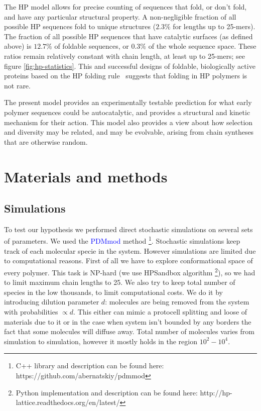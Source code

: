 \documentclass[journal=jacsat,manuscript=article,layout=twocolumn]{achemso}
\newcommand*{\blue}[1]{\textcolor{blue}{#1}}
\begin{document}
 The HP model allows for precise counting of sequences that fold, or don't fold, 
 and have any particular structural property.  A non-negligible fraction of all possible HP 
sequences fold to unique structures ($2.3\% $ for lengths up to 25-mers).  The fraction of all 
possible HP sequences that have catalytic surfaces (as defined above) is $12.7\%$ of foldable 
sequences, or $0.3\%$ of the whole sequence space.  These ratios remain relatively constant with 
chain length, at least up to 25-mers; see figure \ref{fig:hp-statistics}.  This and successful 
designs of foldable, biologically active proteins based on the HP folding rule~\cite{Murphy2015} 
suggests that folding in HP polymers is not rare.  
 
  The present model provides an experimentally testable prediction for what early 
  polymer sequences could be autocatalytic, and provides a structural and kinetic mechanism for 
their action.  This model also provides a view about how selection and diversity may be related, 
and may be evolvable, arising from chain syntheses that are otherwise random.








\section{Materials and methods}\label{sec:mat}
\subsection{Simulations}\label{sec:mat-sim}
To test our hypothesis we performed direct stochastic simulations on several sets of parameters. We 
used the \blue{PDMmod} method \cite{Bernatskiy}
\footnote{C++ library and description can be found here: https://github.com/abernatskiy/pdmmod}. 
Stochastic simulations keep track of each 
molecular specie in the system. However simulations are limited due to computational reasons. 
First of all we have to explore conformational space of every polymer. This task is NP-hard (we use 
HPSandbox algorithm\cite{lau1989lattice,Dill2008} \footnote{Python implementation and description 
can be found here: http://hp-lattice.readthedocs.org/en/latest/}), so we had to limit 
maximum chain lengths to 25. We also try to keep total number of species in the low thousands, to 
limit computational costs. We do it by introducing dilution parameter $d$: molecules are being 
removed from the system with probabilities $\propto d$. 
This either can mimic a protocell splitting and loose of materials due to it or in the case when 
system isn't bounded by any borders the fact that some molecules will diffuse away. Total number of 
molecules varies from simulation to simulation, 
however it mostly holds in the region $10^2-10^4$.
\end{document}

